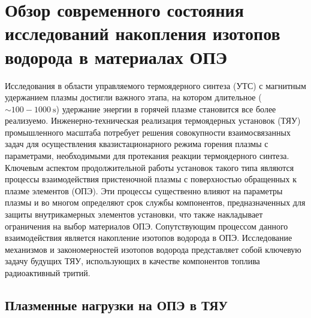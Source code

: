 \chapter{Обзор современного состояния исследований накопления изотопов водорода в материалах ОПЭ}\label{ch:ch1}


Исследования в области управляемого термоядерного синтеза (УТС) с магнитным удержанием плазмы достигли важного этапа, на котором длительное ($\sim100-\SI{1000}{\second}$) удержание энергии в горячей плазме становится все более реализуемо. Инженерно-техническая реализация термоядерных установок (ТЯУ) промышленного масштаба потребует решения совокупности взаимосвязанных задач для осуществления квазистационарного режима горения плазмы с параметрами, необходимыми для протекания реакции термоядерного синтеза. Ключевым аспектом продолжительной работы установок такого типа являются процессы взаимодействия пристеночной плазмы с поверхностью обращенных к плазме элементов (ОПЭ). Эти процессы существенно влияют на параметры плазмы и во многом определяют срок службы компонентов, предназначенных для защиты внутрикамерных элементов установки, что также накладывает ограничения на выбор материалов ОПЭ. Сопутствующим процессом данного взаимодействия является накопление изотопов водорода в ОПЭ. Исследование механизмов и закономерностей изотопов водорода представляет собой ключевую задачу будущих ТЯУ, использующих в качестве компонентов топлива радиоактивный тритий.

\section{Плазменные нагрузки на ОПЭ в ТЯУ}\label{sec:ch1/sec1}

